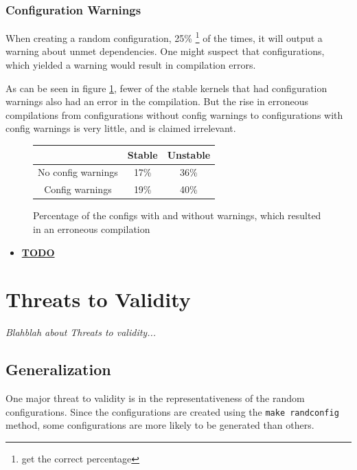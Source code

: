 \documentclass[a4paper,11pt]{report}
\newcommand{\textcode}[1]{
    \fboxsep=1pt
    \texttt{\colorbox{gray!20}{#1}}
}
\newcommand{\figa}{
    \begin{figure}[!htpb]
    \centering
}
\newcommand{\figb}[2]{
    \caption{#1}
    \label{#2}
    \end{figure}
}
\begin{document}
    \subsection{Configuration Warnings}
When creating a random configuration, 25\%
    \footnote{get the correct percentage}
of the times, it will output a warning about unmet dependencies. One might
suspect that configurations, which yielded a warning would result in
compilation errors. 

As can be seen in figure \ref{tbl:confwarns}, fewer of the stable kernels that 
had configuration warnings also had an error in the compilation. But the rise 
in erroneous compilations from configurations without config warnings to 
configurations with config warnings is very little, and is claimed irrelevant.

\figa
    \begin{tabular}{c|c|c}
    \hline
    \hline
        & \textbf{Stable} & \textbf{Unstable} \\
    \hline
    No config warnings & 17\% & 36\%\\
    Config warnings & 19\% & 40\%\\
    \hline
    \hline
    \end{tabular}
\figb{Percentage of the configs with and without warnings, which resulted in an 
    erroneous compilation}{tbl:confwarns}

\begin{itemize}
    \item \underline{\textbf{TODO}}
\end{itemize}


\newpage
    \chapter{Threats to Validity}
\label{ch:ttv}

\emph{Blahblah about Threats to validity...}

\section{Generalization}
\label{sec:gen}

One major threat to validity is in the representativeness of the random 
configurations. Since the configurations are created using the \textcode{make 
randconfig} method, some configurations are more likely to be generated than 
others.
\end{document}
